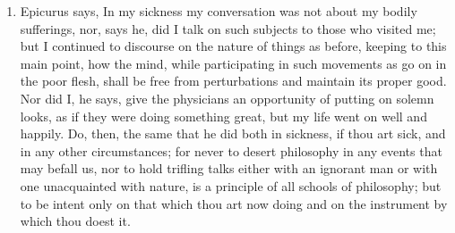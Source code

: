 \begin{enumerate}
\item Epicurus says, In my sickness my conversation was not about my bodily sufferings, nor, says he, did I talk on such subjects to those who visited me; but I continued to discourse on the nature of things as before, keeping to this main point, how the mind, while participating in such movements as go on in the poor flesh, shall be free from perturbations and maintain its proper good. Nor did I, he says, give the physicians an opportunity of putting on solemn looks, as if they were doing something great, but my life went on well and happily. Do, then, the same that he did both in sickness, if thou art sick, and in any other circumstances; for never to desert philosophy in any events that may befall us, nor to hold trifling talks either with an ignorant man or with one unacquainted with nature, is a principle of all schools of philosophy; but to be intent only on that which thou art now doing and on the instrument by which thou doest it.


\end{enumerate}
